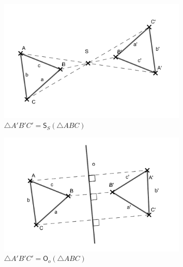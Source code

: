 \documentclass[12pt,a4wide,oneside,
headings]{report}
\begin{document}
\begin{figure}
\begin{subfigure}{0.5\textwidth}
\includegraphics[width=\textwidth]{souhrn/str_soum}
\caption{$\triangle A'B'C'=\mathsf{S}_S(\triangle ABC)$}
\label{fig:str_soum}
\end{subfigure}
\begin{subfigure}{0.5\textwidth}
\includegraphics[width=\textwidth]{souhrn/os_soum}
\caption{$\triangle A'B'C'=\mathsf{O}_o(\triangle ABC)$}
\label{fig:os_soum}
\end{subfigure}
\begin{subfigure}{0.42\textwidth}
\centering

\end{subfigure}
\end{figure}
\end{document}

